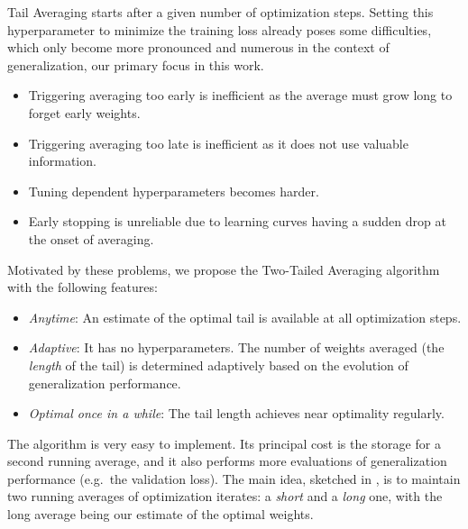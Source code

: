 \documentclass[twocolumn]{article}
\begin{document}
Tail Averaging starts after a given number of optimization steps.
Setting this hyperparameter to minimize the training loss already poses some difficulties, which only become more pronounced and numerous in the context of generalization, our primary focus in this work.
\begin{itemize}
\item Triggering averaging too early is inefficient as the average must grow long to forget early weights.
\item Triggering averaging too late is inefficient as it does not use valuable information.
\item Tuning dependent hyperparameters becomes harder.
\item Early stopping is unreliable due to learning curves having a sudden drop at the onset of averaging.
\end{itemize}

Motivated by these problems, we propose the Two-Tailed Averaging algorithm with the following features:
\begin{itemize}
\item \emph{Anytime}: An estimate of the optimal tail is available at all optimization steps.
\item \emph{Adaptive}: It has no hyperparameters.
The number of weights averaged (the \emph{length} of the tail) is determined adaptively based on the evolution of generalization performance.
\item \emph{Optimal once in a while}: The tail length achieves near optimality regularly.
\end{itemize}

The algorithm is very easy to implement.
Its principal cost is the storage for a second running average, and it also performs more evaluations of generalization performance (e.g.\ the validation loss).
The main idea, sketched in , is to maintain two running averages of optimization iterates: a \emph{short} and a \emph{long} one, with the long average being our estimate of the optimal weights.
\end{document}

